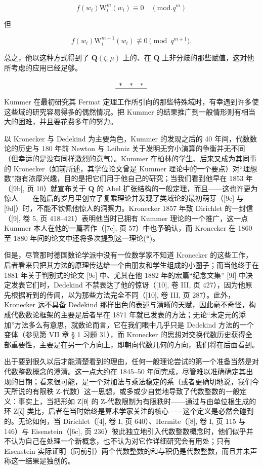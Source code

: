 \[
f (w _ {i}) \mathrm{W} _ {i} ^ {m} (w _ {i}) \equiv 0 \quad (\mathrm{mod.} q ^ {m})
\]

但

\[
f (w _ {i}) \mathrm{W} _ {i} ^ {m + 1} (w _ {i}) \not \equiv 0 \pmod {q ^ {m + 1}}.
\]

总之，他以这种方式得到了 \(\mathbf{Q}(\zeta, \mu)\) 上的、在 \(\mathbf{Q}\) 上非分歧的那些赋值，这对他所考虑的应用已经足够。

\[
\begin{array}{c c c} \ast & \ast & \ast \\ \hline \end{array}
\]

Kummer 在最初研究其 Fermat 定理工作所引向的那些特殊域时，有幸遇到许多使这些域的研究容易得多的偶然情况。把 Kummer 的结果推广到一般情形则有相当大的困难，并且要花费多年的努力。

以 Kronecker 与 Dedekind 为主要角色，Kummer 的发现之后的 40 年间，代数数论的历史与 180 年前 Newton 与 Leibniz 关于发明无穷小演算的争衡并无不同（但幸运的是没有同样激烈的意气）。Kummer 在柏林的学生、后来又成为其同事的 Kronecker（如前所述，其学位论文曾是 Kummer 理论中的一个要点）对“理想数”抱有浓厚兴趣，目的是把它们用于他自己的研究；当我们看到他早在 1853 年（{[}9b{]}, 页 10）就宣布关于 \(\mathbf{Q}\) 的 Abel 扩张结构的一般定理，而且——这也许更为惊人——在随后的岁月里创立了复乘理论并发现了类域论的最初萌芽（{[}9c{]} 与 {[}9d{]}）时，不能不钦佩他惊人的洞察力。Kronecker 1857 年致 Dirichlet 的一封信（{[}9{]}, 卷 5, 页 418–421）表明他当时已拥有 Kummer 理论的一个推广，这一点 Kummer 本人在他的一篇著作（{[}7e{]}, 页 57）中也予确认，而 Kronecker 在 1860 至 1880 年间的论文中还将多次提到这一理论(*)。

但是，尽管那时德国数论学派中没有一位数学家不知道 Kronecker 的这些工作，后者看来只把其方法的原理传达给一个由朋友和学生组成的小圈子；而当他终于在 1881 年关于判别式的论文 {[}9e{]} 中、尤其在他 1882 年的宏篇“纪念文集” {[}9f{]} 中决定发表它们时，Dedekind 不禁表达了他的惊讶（{[}10{]}, 卷 III, 页 427），因为他原先根据听到的传闻，以为那些方法完全不同（{[}10{]}, 卷 III, 页 287）。此外，Kronecker 远不具备 Dedekind 那样出色的表述与清晰的天赋，因此毫不奇怪，构成代数数论框架的主要是后者早在 1871 年就已发表的方法；无论“未定元的添加”方法多么有意思，就数论而言，它在我们眼中几乎只是 Dedekind 方法的一个变体（参见第 VII 章 § 1 习题 31），而 Kronecker 的思想对交换代数历史获得全部重要性，主要是在另一个方向上，即朝向代数几何的方向，我们将在后面看到。

出于要到很久以后才能清楚看到的理由，任何一般理论尝试的第一个准备当然是对代数整数概念的澄清。这一点大约在 1845–50 年间完成，尽管难以准确确定其出现的日期；看来很可能，是一个对加法与乘法稳定的系（或者更确切地说，我们今天所说的有限秩 Z-代数）这一思想，或多或少自觉地导致了代数整数的一般定义：事实上，当把形如 Z{[}θ{]} 的 Z-代数限制为有限秩时——通过与由单位根生成的环 Z{[}ζ{]} 类比，后者在当时始终是算术学家关注的核心——这个定义是必然会碰到的。无论如何，当 Dirichlet（{[}4{]}, 卷 I, 页 640）、Hermite（{[}8{]}, 卷 I, 页 115 与 146）与 Eisenstein（{[}6c{]}, 页 236）彼此独立地引入代数整数概念时，他们似乎并不认为自己在处理一个新概念，也不认为对它作详细研究会有用处；只有 Eisenstein 实际证明（同前引）两个代数整数的和与积仍是代数整数，而且并未声称这一结果是独创的。

